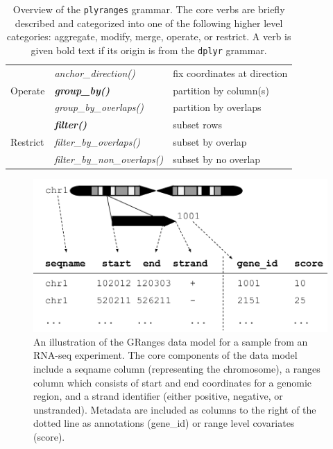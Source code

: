 \documentclass[]{article}
\begin{document}
\begin{table}[!htbp]
\begin{tabular}{|l|l|p{6cm}|}
  \hline
   & \emph{anchor\_direction()} & fix coordinates at direction \\
  Operate & \textbf{\emph{group\_by()}} & partition by column(s)  \\ 
   & \emph{group\_by\_overlaps()} & partition by overlaps \\
   \hline
   & \textbf{\emph{filter()}} & subset rows \\
  Restrict & \emph{filter\_by\_overlaps()} & subset by overlap \\
    & \emph{filter\_by\_non\_overlaps()} & subset by no overlap \\
   \hline
\end{tabular}
\caption{Overview of the \texttt{plyranges} grammar. The core verbs are
briefly described and categorized into one of the following higher level 
categories: aggregate, modify, merge, operate, or restrict. A verb is given bold text if
its origin is from the \texttt{dplyr} grammar.}\label{tab:grammar}
\end{table}



\begin{figure}
\includegraphics[width=\textwidth]{diagrams/GRanges}
\caption{An illustration of the GRanges data model for a
sample from an RNA-seq experiment. The core components of the data model
include a seqname column (representing the chromosome), a ranges column
which consists of start and end coordinates for a genomic region, and a
strand identifier (either positive, negative, or unstranded). Metadata
are included as columns to the right of the dotted line as annotations
(gene\_id) or range level covariates (score).}
\label{fig:GRanges} 
\end{figure}
\end{document}
